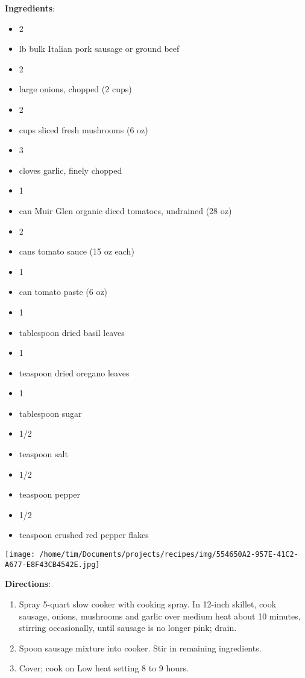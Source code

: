 \documentclass[11pt, twoside, openany]{book}
\begin{document}
\begin{minipage}[t]{0.8\linewidth}
\textbf{Ingredients}:\vspace{-3mm}
\begin{multicols}{2}
\begin{itemize}\setlength\itemsep{-1mm}
\item 2 
\item lb bulk Italian pork sausage or ground beef
\item 2 
\item large onions, chopped (2 cups)
\item 2 
\item cups sliced fresh mushrooms (6 oz)
\item 3 
\item cloves garlic, finely chopped
\item 1 
\item can Muir Glen organic diced tomatoes, undrained (28 oz)
\item 2 
\item cans tomato sauce (15 oz each)
\item 1 
\item can tomato paste (6 oz)
\item 1 
\item tablespoon dried basil leaves
\item 1 
\item teaspoon dried oregano leaves
\item 1 
\item tablespoon sugar
\item 1/2 
\item teaspoon salt
\item 1/2 
\item teaspoon pepper
\item 1/2 
\item teaspoon crushed red pepper flakes
\end{itemize}
\end{multicols}
\end{minipage}
\begin{minipage}[t]{0.2\linewidth}
\centering \strut\vspace*{-\baselineskip}\newline
\texttt{[image: /home/tim/Documents/projects/recipes/img/554650A2-957E-41C2-A677-E8F43CB4542E.jpg]}\\
\end{minipage}\vspace{3mm}
\textbf{Directions}:
\vspace{-3mm}\begin{enumerate}\setlength\itemsep{-1mm}
\item Spray 5-quart slow cooker with cooking spray. In 12-inch skillet, cook sausage, onions, mushrooms and garlic over medium heat about 10 minutes, stirring occasionally, until sausage is no longer pink; drain.
\item Spoon sausage mixture into cooker. Stir in remaining ingredients.
\item Cover; cook on Low heat setting 8 to 9 hours.
\end{enumerate}
\end{document}
